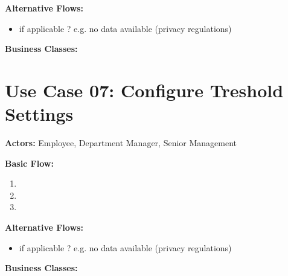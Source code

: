 \documentclass{article}
\begin{document}
\textbf{Alternative Flows:}
\begin{itemize}
    \item if applicable ? e.g. no data available (privacy regulations)
\end{itemize}

\textbf{Business Classes:}
\vspace{1em}

\section*{Use Case 07: Configure Treshold Settings}

\textbf{Actors:} Employee, Department Manager, Senior Management 

\textbf{Basic Flow:}
\begin{enumerate}
    \item
    \item
    \item 
\end{enumerate}

\textbf{Alternative Flows:}
\begin{itemize}
    \item if applicable ? e.g. no data available (privacy regulations)
\end{itemize}

\textbf{Business Classes:}
\vspace{1em}
\end{document}
